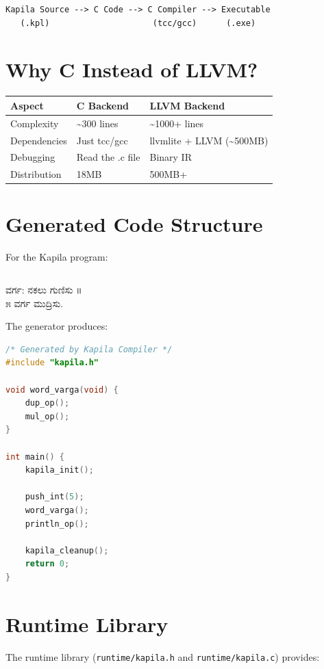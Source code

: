 \documentclass[11pt,a4paper]{report}
\newcommand{\kannada}[1]{{\kannadafont #1}}
\begin{document}
\begin{verbatim}
Kapila Source --> C Code --> C Compiler --> Executable
   (.kpl)                     (tcc/gcc)      (.exe)
\end{verbatim}

\section{Why C Instead of LLVM?}

\begin{tabular}{lll}
\toprule
Aspect & C Backend & LLVM Backend \\
\midrule
Complexity & \textasciitilde300 lines & \textasciitilde1000+ lines \\
Dependencies & Just tcc/gcc & llvmlite + LLVM (\textasciitilde500MB) \\
Debugging & Read the .c file & Binary IR \\
Distribution & 18MB & 500MB+ \\
\bottomrule
\end{tabular}

\section{Generated Code Structure}

For the Kapila program:
\begin{verbatim}
\end{verbatim}
\kannada{ವರ್ಗ: ನಕಲು ಗುಣಿಸು ॥}\\
\kannada{೫ ವರ್ಗ ಮುದ್ರಿಸು.}

\vspace{0.3cm}
The generator produces:

\begin{lstlisting}[language=C]
/* Generated by Kapila Compiler */
#include "kapila.h"

void word_varga(void) {
    dup_op();
    mul_op();
}

int main() {
    kapila_init();

    push_int(5);
    word_varga();
    println_op();

    kapila_cleanup();
    return 0;
}
\end{lstlisting}

\section{Runtime Library}

The runtime library (\texttt{runtime/kapila.h} and \texttt{runtime/kapila.c}) provides:
\end{document}
